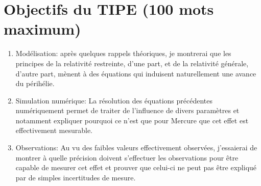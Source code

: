 \documentclass[12pt,a4paper]{article}
\begin{document}
\section*{Objectifs du TIPE (100 mots maximum)}
\begin{enumerate}
	\item	Modélisation: après quelques rappels théoriques, je montrerai que les principes de la relativité restreinte, d'une part, et de la relativité générale, d'autre part, mènent à des équations qui induisent naturellement une avance du périhélie.
    
    \item	Simulation numérique: La résolution des équations précédentes numériquement permet de traiter de l'influence de divers paramètres et notamment expliquer pourquoi ce n'est que pour Mercure que cet effet est effectivement mesurable.
    
    \item	Observations: Au vu des faibles valeurs effectivement observées, j'essaierai de montrer à quelle précision doivent s'effectuer les observations pour être capable de mesurer cet effet et prouver que celui-ci ne peut pas être expliqué par de simples incertitudes de mesure.
\end{enumerate}
\end{document}
